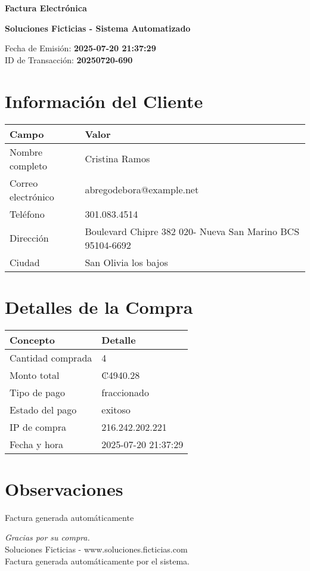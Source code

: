 \documentclass[12pt]{article}
\begin{document}
\begin{center}
    \Huge \textbf{Factura Electrónica}

    \vspace{0.3cm}
    \large \textbf{Soluciones Ficticias - Sistema Automatizado}

    \vspace{0.5cm}
    \normalsize Fecha de Emisión: \textbf{2025-07-20 21:37:29} \\
    ID de Transacción: \textbf{20250720-690} \\
\end{center}

\vspace{1cm}

\section*{Información del Cliente}
\begin{tabularx}{\textwidth}{L{4cm} L{12cm}}
\textbf{Campo} & \textbf{Valor} \\
\hline
Nombre completo & Cristina Ramos \\
Correo electrónico & abregodebora@example.net \\
Teléfono & 301.083.4514 \\
Dirección & Boulevard Chipre 382 020- Nueva San Marino  BCS 95104-6692 \\
Ciudad & San Olivia los bajos \\
\end{tabularx}

\vspace{0.8cm}

\section*{Detalles de la Compra}
\begin{tabularx}{\textwidth}{L{6cm} L{10cm}}
\textbf{Concepto} & \textbf{Detalle} \\
\hline
Cantidad comprada & 4 \\
Monto total & ₡4940.28 \\
Tipo de pago & fraccionado \\
Estado del pago & exitoso \\
IP de compra & 216.242.202.221 \\
Fecha y hora & 2025-07-20 21:37:29 \\
\end{tabularx}

\vspace{1.5cm}

\section*{Observaciones}
Factura generada automáticamente

\vfill

\begin{center}
    \textit{Gracias por su compra.} \\
    Soluciones Ficticias - www.soluciones.ficticias.com \\
    Factura generada automáticamente por el sistema.
\end{center}
\end{document}
